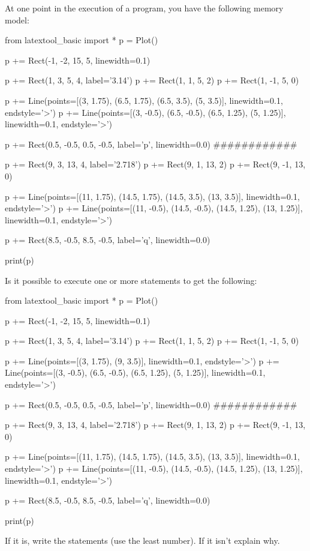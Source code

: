 \begin{ex}
At one point in the execution of a program, you have the following memory model:
\begin{python}
from latextool_basic import *
p = Plot()

p += Rect(-1, -2, 15, 5, linewidth=0.1)

p += Rect(1, 3, 5, 4, label='3.14')
p += Rect(1, 1, 5, 2)
p += Rect(1, -1, 5, 0)

p += Line(points=[(3, 1.75), (6.5, 1.75), (6.5, 3.5), (5, 3.5)],
          linewidth=0.1, endstyle='>')
p += Line(points=[(3, -0.5), (6.5, -0.5), (6.5, 1.25), (5, 1.25)],
          linewidth=0.1, endstyle='>')

p += Rect(0.5, -0.5, 0.5, -0.5, label='p', linewidth=0.0)
############

p += Rect(9, 3, 13, 4, label='2.718')
p += Rect(9, 1, 13, 2)
p += Rect(9, -1, 13, 0)

p += Line(points=[(11, 1.75), (14.5, 1.75), (14.5, 3.5), (13, 3.5)],
          linewidth=0.1, endstyle='>')
p += Line(points=[(11, -0.5), (14.5, -0.5), (14.5, 1.25), (13, 1.25)],
          linewidth=0.1, endstyle='>')

p += Rect(8.5, -0.5, 8.5, -0.5, label='q', linewidth=0.0)

print(p)
\end{python}

Is it possible to execute one or more statements to get the following:
\begin{python}
from latextool_basic import *
p = Plot()

p += Rect(-1, -2, 15, 5, linewidth=0.1)

p += Rect(1, 3, 5, 4, label='3.14')
p += Rect(1, 1, 5, 2)
p += Rect(1, -1, 5, 0)

p += Line(points=[(3, 1.75), (9, 3.5)],
          linewidth=0.1, endstyle='>')
p += Line(points=[(3, -0.5), (6.5, -0.5), (6.5, 1.25), (5, 1.25)],
          linewidth=0.1, endstyle='>')

p += Rect(0.5, -0.5, 0.5, -0.5, label='p', linewidth=0.0)
############

p += Rect(9, 3, 13, 4, label='2.718')
p += Rect(9, 1, 13, 2)
p += Rect(9, -1, 13, 0)

p += Line(points=[(11, 1.75), (14.5, 1.75), (14.5, 3.5), (13, 3.5)],
          linewidth=0.1, endstyle='>')
p += Line(points=[(11, -0.5), (14.5, -0.5), (14.5, 1.25), (13, 1.25)],
          linewidth=0.1, endstyle='>')

p += Rect(8.5, -0.5, 8.5, -0.5, label='q', linewidth=0.0)

print(p)
\end{python}

If it is, write the statements (use the least number). If it isn't explain why.
\end{ex}

